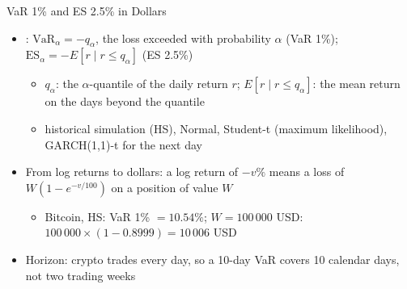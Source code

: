 \begin{frame}{VaR 1\% and ES 2.5\% in Dollars}
\itemsize{\small}
\begin{itemize}
    \item {}: $\mathrm{VaR}_\alpha = -q_\alpha$, the loss exceeded with probability $\alpha$ (VaR 1\%); $\mathrm{ES}_\alpha = -E[r \mid r \le q_\alpha]$ (ES 2.5\%)
    \begin{itemize}
        \item $q_\alpha$: the $\alpha$-quantile of the daily return $r$; $E[r \mid r \le q_\alpha]$: the mean return on the days beyond the quantile
        \item historical simulation (HS), Normal, Student-t (maximum likelihood), GARCH(1,1)-t for the next day
    \end{itemize}
    \item From log returns to dollars: a log return of $-v\%$ means a loss of $W(1 - e^{-v/100})$ on a position of value $W$
    \begin{itemize}
        \item Bitcoin, HS: VaR 1\% $= 10.54\%$; $W = 100\,000$ USD: $100\,000 \times (1 - 0.8999) = 10\,006$ USD
    \end{itemize}
    \item Horizon: crypto trades every day, so a 10-day VaR covers 10 calendar days, not two trading weeks
\end{itemize}
\end{frame}

